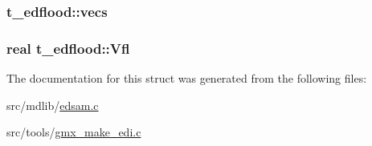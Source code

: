 \hypertarget{structt__edflood_a2d7aeb339809d50df3b4695aeabfa4bb}{
\subsubsection[{vecs}]{ {\bf t\-\_\-edflood\-::vecs}}}\label{structt__edflood_a2d7aeb339809d50df3b4695aeabfa4bb}
\hypertarget{structt__edflood_a593d4dc8c7759c26308bddcb2bc957f8}{
\subsubsection[{\-Vfl}]{\setlength{\rightskip}{0pt plus 5cm}real {\bf t\-\_\-edflood\-::\-Vfl}}}\label{structt__edflood_a593d4dc8c7759c26308bddcb2bc957f8}


\-The documentation for this struct was generated from the following files\-:\begin{DoxyCompactItemize}
\item 
src/mdlib/\hyperlink{edsam_8c}{edsam.\-c}\item 
src/tools/\hyperlink{gmx__make__edi_8c}{gmx\-\_\-make\-\_\-edi.\-c}\end{DoxyCompactItemize}
